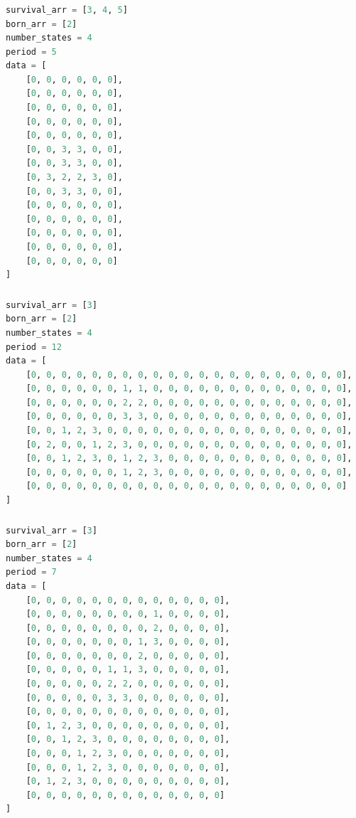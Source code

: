 \documentclass[12pt]{article}
\numberwithin{figure}{section} %
\begin{document}
\subsubsection{}
\begin{lstlisting}[language = Python]
survival_arr = [3, 4, 5]
born_arr = [2]
number_states = 4
period = 5
data = [
    [0, 0, 0, 0, 0, 0],
    [0, 0, 0, 0, 0, 0],
    [0, 0, 0, 0, 0, 0],
    [0, 0, 0, 0, 0, 0],
    [0, 0, 0, 0, 0, 0],
    [0, 0, 3, 3, 0, 0],
    [0, 0, 3, 3, 0, 0],
    [0, 3, 2, 2, 3, 0], 
    [0, 0, 3, 3, 0, 0],
    [0, 0, 0, 0, 0, 0],
    [0, 0, 0, 0, 0, 0],
    [0, 0, 0, 0, 0, 0],
    [0, 0, 0, 0, 0, 0],
    [0, 0, 0, 0, 0, 0]
]
\end{lstlisting}

\subsubsection{}
\begin{lstlisting}[language = Python]
survival_arr = [3]
born_arr = [2]
number_states = 4
period = 12
data = [
    [0, 0, 0, 0, 0, 0, 0, 0, 0, 0, 0, 0, 0, 0, 0, 0, 0, 0, 0, 0, 0],
    [0, 0, 0, 0, 0, 0, 1, 1, 0, 0, 0, 0, 0, 0, 0, 0, 0, 0, 0, 0, 0],
    [0, 0, 0, 0, 0, 0, 2, 2, 0, 0, 0, 0, 0, 0, 0, 0, 0, 0, 0, 0, 0],
    [0, 0, 0, 0, 0, 0, 3, 3, 0, 0, 0, 0, 0, 0, 0, 0, 0, 0, 0, 0, 0],
    [0, 0, 1, 2, 3, 0, 0, 0, 0, 0, 0, 0, 0, 0, 0, 0, 0, 0, 0, 0, 0],
    [0, 2, 0, 0, 1, 2, 3, 0, 0, 0, 0, 0, 0, 0, 0, 0, 0, 0, 0, 0, 0],
    [0, 0, 1, 2, 3, 0, 1, 2, 3, 0, 0, 0, 0, 0, 0, 0, 0, 0, 0, 0, 0],
    [0, 0, 0, 0, 0, 0, 1, 2, 3, 0, 0, 0, 0, 0, 0, 0, 0, 0, 0, 0, 0],
    [0, 0, 0, 0, 0, 0, 0, 0, 0, 0, 0, 0, 0, 0, 0, 0, 0, 0, 0, 0, 0]
]
\end{lstlisting}

\subsubsection{}
\begin{lstlisting}[language = Python]
survival_arr = [3]
born_arr = [2]
number_states = 4
period = 7
data = [
    [0, 0, 0, 0, 0, 0, 0, 0, 0, 0, 0, 0, 0],
    [0, 0, 0, 0, 0, 0, 0, 0, 1, 0, 0, 0, 0],
    [0, 0, 0, 0, 0, 0, 0, 0, 2, 0, 0, 0, 0],
    [0, 0, 0, 0, 0, 0, 0, 1, 3, 0, 0, 0, 0],
    [0, 0, 0, 0, 0, 0, 0, 2, 0, 0, 0, 0, 0],
    [0, 0, 0, 0, 0, 1, 1, 3, 0, 0, 0, 0, 0],
    [0, 0, 0, 0, 0, 2, 2, 0, 0, 0, 0, 0, 0],
    [0, 0, 0, 0, 0, 3, 3, 0, 0, 0, 0, 0, 0],
    [0, 0, 0, 0, 0, 0, 0, 0, 0, 0, 0, 0, 0],
    [0, 1, 2, 3, 0, 0, 0, 0, 0, 0, 0, 0, 0],
    [0, 0, 1, 2, 3, 0, 0, 0, 0, 0, 0, 0, 0],
    [0, 0, 0, 1, 2, 3, 0, 0, 0, 0, 0, 0, 0],
    [0, 0, 0, 1, 2, 3, 0, 0, 0, 0, 0, 0, 0],
    [0, 1, 2, 3, 0, 0, 0, 0, 0, 0, 0, 0, 0],
    [0, 0, 0, 0, 0, 0, 0, 0, 0, 0, 0, 0, 0]
]

\end{lstlisting}
\end{document}
